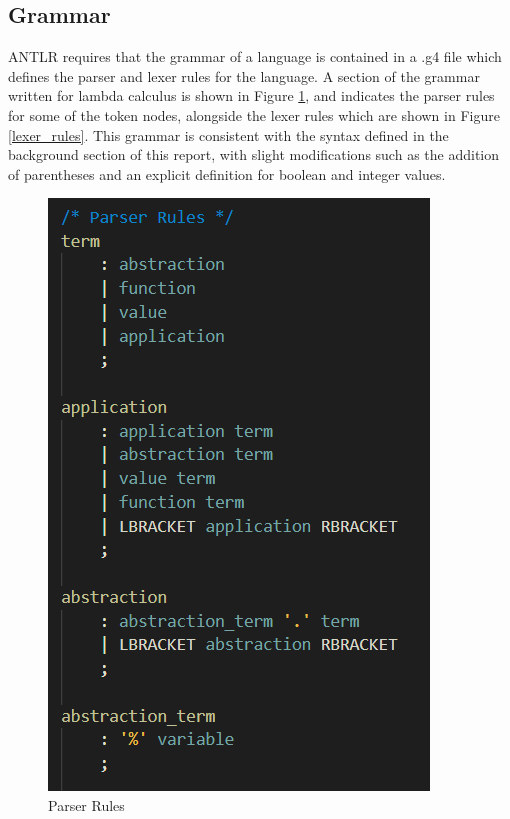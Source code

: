 \documentclass[a4paper,11pt]{report}
\begin{document}
\subsection{Grammar}

ANTLR requires that the grammar of a language is contained in a .g4 file which defines the parser and lexer rules for the language. A section of the grammar written for lambda calculus is shown in Figure \ref{parser_rules}, and indicates the parser rules for some of the token nodes, alongside the lexer rules which are shown in Figure \ref{lexer_rules}. This grammar is consistent with the syntax defined in the background section of this report, with slight modifications such as the addition of parentheses and an explicit definition for boolean and integer values.

\begin{figure}[p]
\centering
\includegraphics[scale=0.75]{images/parser_rules}
\caption{Parser Rules}
\label{parser_rules}
\end{figure}
\end{document}
